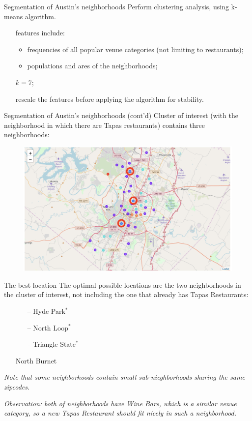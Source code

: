 \documentclass{beamer}
\begin{document}
    \begin{frame}{Segmentation of Austin's neighborhoods}
Perform clustering analysis, using k-means algorithm.
    \begin{itemize}
    \item[\EightStarTaper] features include:
    \begin{itemize}
    \item frequencies of all popular venue categories (not limiting to restaurants);
    \item populations and ares of the neighborhoods;
    \end{itemize}
    \item[\EightStarTaper] $k = 7$;
    \item[\EightStarTaper] rescale the features before applying the algorithm for stability.
      \end{itemize}
  \end{frame}
    \begin{frame}{Segmentation of Austin's neighborhoods (cont'd)}
    Cluster of interest (with the neighborhood in which there are Tapas restaurants) contains three neighborhoods:
\begin{figure}[H]
	\centering
	\includegraphics[width=.9\textwidth]{pics/clusters_2}
\end{figure}
  \end{frame}
    \begin{frame}{The best location}
The optimal possible locations are the two neighborhoods in the cluster of interest, not including the one that already has Tapas Restaurants:
{\bf 
 \begin{itemize}
 \item[\EightStarTaper]
    \begin{itemize} 
    \item[--] Hyde Park$^*$
    \item[--] North Loop$^*$
    \item[--] Triangle State$^*$
    \end{itemize}
    \item[\EightStarTaper] North Burnet
      \end{itemize}
   }
   {\tiny {\it *Note that some neighborhoods contain small sub-nieghborhoods sharing the same zipcodes.}}
   
  {\it Observation: both of neighborhoods have Wine Bars, which is a similar venue category, so a new Tapas Restaurant should fit nicely in such a neighborhood.}
  \end{frame}
\end{document}

